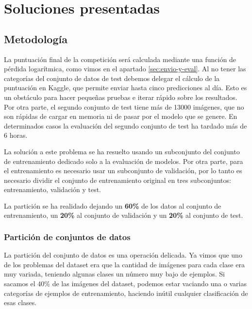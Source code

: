 
\chapter{Soluciones presentadas} %
\label{cap:soluciones} %

\section{Metodología}

La puntuación final de la competición será calculada mediante una función de pérdida logarítmica, como vimos en el apartado \ref{sec:envio-y-eval}. Al no tener las categorías del conjunto de datos de test debemos delegar el cálculo de la puntuación en Kaggle, que permite enviar hasta cinco predicciones al día. Esto es un obstáculo para hacer pequeñas pruebas e iterar rápido sobre los resultados. Por otra parte, el segundo conjunto de test tiene más de 13000 imágenes, que no son rápidas de cargar en memoria ni de pasar por el modelo que se genere. En determinados casos la evaluación del segundo conjunto de test ha tardado más de 6 horas.

La solución a este problema se ha resuelto usando un subconjunto del conjunto de entrenamiento dedicado solo a la evaluación de modelos. Por otra parte, para el entrenamiento es necesario usar un subconjunto de validación, por lo tanto es necesario dividir el conjunto de entrenamiento original en tres subconjuntos: entrenamiento, validación y test.

La partición se ha realidado dejando un \textbf{60\%} de los datos al conjunto de entrenamiento, un \textbf{20\%} al conjunto de validación y un \textbf{20\%} al conjunto de test.


\subsection{Partición de conjuntos de datos}
La partición del conjunto de datos es una operación delicada. Ya vimos que uno de los problemas del dataset era que la cantidad de imágenes para cada clase era muy variada, teniendo algunas clases un número muy bajo de ejemplos. Si sacamos el 40\% de las imágenes del dataset, podemos estar vaciando una o varias categorías de ejemplos de entrenamiento, haciendo inútil cualquier clasificación de esas clases.

